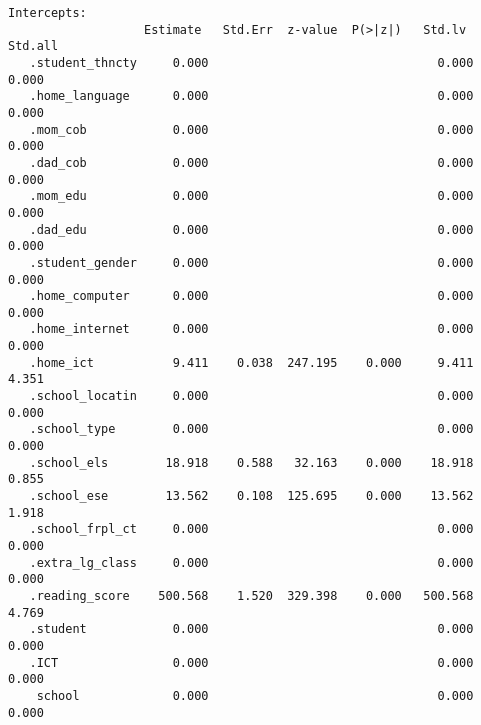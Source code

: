 \documentclass[
]{article}
\begin{document}
\begin{verbatim}
Intercepts:
                   Estimate   Std.Err  z-value  P(>|z|)   Std.lv   Std.all
   .student_thncty     0.000                                0.000    0.000
   .home_language      0.000                                0.000    0.000
   .mom_cob            0.000                                0.000    0.000
   .dad_cob            0.000                                0.000    0.000
   .mom_edu            0.000                                0.000    0.000
   .dad_edu            0.000                                0.000    0.000
   .student_gender     0.000                                0.000    0.000
   .home_computer      0.000                                0.000    0.000
   .home_internet      0.000                                0.000    0.000
   .home_ict           9.411    0.038  247.195    0.000     9.411    4.351
   .school_locatin     0.000                                0.000    0.000
   .school_type        0.000                                0.000    0.000
   .school_els        18.918    0.588   32.163    0.000    18.918    0.855
   .school_ese        13.562    0.108  125.695    0.000    13.562    1.918
   .school_frpl_ct     0.000                                0.000    0.000
   .extra_lg_class     0.000                                0.000    0.000
   .reading_score    500.568    1.520  329.398    0.000   500.568    4.769
   .student            0.000                                0.000    0.000
   .ICT                0.000                                0.000    0.000
    school             0.000                                0.000    0.000


\end{verbatim}
\end{document}
